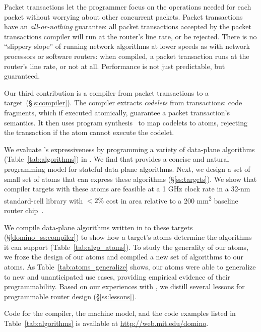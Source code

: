 Packet transactions let the programmer focus on the operations needed for each
packet without worrying about other concurrent packets. Packet transactions
have an \textit{all-or-nothing} guarantee: all packet transactions accepted by
the packet transactions compiler will run at the router's line rate, or be
rejected.  There is no ``slippery slope'' of running network algorithms at
lower speeds as with network processors or software routers: when compiled, a
packet transaction runs at the router's line rate, or not at all.  Performance
is not just predictable, but guaranteed.

Our third contribution is a compiler from \pktlanguage packet transactions to a
\absmachine target~(\S\ref{s:compiler}). The \pktlanguage compiler extracts
{\em codelets} from  transactions: code fragments, which if executed
atomically, guarantee a packet transaction's semantics. It then uses program
synthesis~\cite{sketch_asplos} to map codelets to atoms, rejecting the
transaction if the atom cannot execute the codelet.

We evaluate \pktlanguage's expressiveness by programming a variety of
data-plane algorithms (Table~\ref{tab:algorithms}) in \pktlanguage. We find
that \pktlanguage provides a concise and natural programming model for stateful
data-plane algorithms.  Next, we design a set of small set of atoms that can
express these algorithms (\S\ref{ss:targets}).  We show that compiler targets
with these atoms are feasible at a 1 GHz clock rate in a 32-nm standard-cell
library with $< 2\%$ cost in area relative to a 200 \si{\milli\metre\squared}
baseline router chip~\cite{gibb_parsing}.

We compile data-plane algorithms written in \pktlanguage to these targets
(\S\ref{domino_ss:compiler}) to show how a target's atoms determine the
algorithms it can support (Table~\ref{tab:algo_atoms}). To study the generality
of our atoms, we froze the design of our atoms and compiled a new set of
\pktlanguage algorithms to our atoms. As Table~\ref{tab:atoms_generalize}
shows, our atoms were able to generalize to new and unanticipated use cases,
providing empirical evidence of their programmability. Based on our experiences
with \pktlanguage, we distill several lessons for programmable router design
(\S\ref{ss:lessons}).

Code for the \pktlanguage compiler, the \absmachine machine model, and the code
examples listed in Table~\ref{tab:algorithms} is available at
\url{http://web.mit.edu/domino}.
